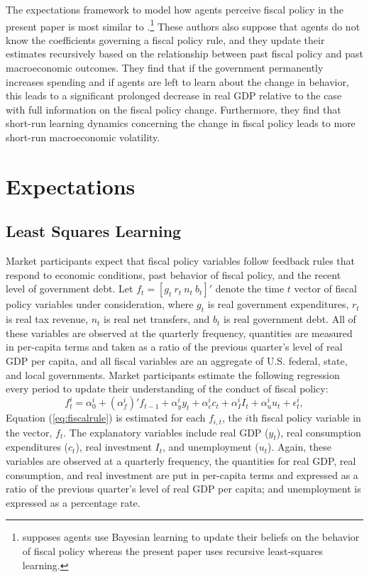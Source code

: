 \documentclass[11pt]{article}
\newcommand{\beq}{\begin{equation}}
\newcommand{\eeq}{\end{equation}}
\newcommand{\citee}[1]{\citet{#1}}
\begin{document}
The expectations framework to model how agents perceive fiscal policy in the present paper is most similar to \citee{hollmatt}.\footnote{\citee{hollmatt} supposes agents use Bayesian learning to update their beliefs on the behavior of fiscal policy whereas the present paper uses recursive least-squares learning.}  These authors also suppose that agents do not know the coefficients governing a fiscal policy rule, and they update their estimates recursively based on the relationship between past fiscal policy and past macroeconomic outcomes.  They find that if the government permanently increases spending and if agents are left to learn about the change in behavior, this leads to a significant prolonged decrease in real GDP relative to the case with full information on the fiscal policy change.  Furthermore, they find that short-run learning dynamics concerning the change in fiscal policy leads to more short-run macroeconomic volatility.

\section{Expectations}

\subsection{Least Squares Learning}
Market participants expect that fiscal policy variables follow feedback rules that respond to economic conditions, past behavior of fiscal policy, and the recent level of government debt.  Let $f_t = [g_t~ r_t~ n_t~ b_t]'$ denote the time $t$ vector of fiscal policy variables under consideration, where $g_t$ is real government expenditures, $r_t$ is real tax revenue, $n_t$ is real net transfers, and $b_t$ is real government debt.  All of these variables are observed at the quarterly frequency, quantities are measured in per-capita terms and taken as a ratio of the previous quarter's level of real GDP per capita, and all fiscal variables are an aggregate of U.S. federal, state, and local governments.  Market participants estimate the following regression every period to update their understanding of the conduct of fiscal policy:
\beq \label{eq:fiscalrule} f^{i}_{t} = \alpha^i_{0} + (\alpha^{i}_{f})' f_{t-1} + \alpha^i_{y} y_t + \alpha^i_c c_t + \alpha^i_I I_t + \alpha^i_u u_t + \epsilon^i_{t}, \eeq
Equation (\ref{eq:fiscalrule}) is estimated for each $f_{i,t}$, the $i$th fiscal policy variable in the vector, $f_t$.  The explanatory variables include real GDP ($y_t$), real consumption expenditures ($c_t$), real investment $I_t$, and unemployment ($u_t$).  Again, these variables are observed at a quarterly frequency, the quantities for real GDP, real consumption, and real investment are put in per-capita terms and expressed as a ratio of the previous quarter's level of real GDP per capita; and unemployment is expressed as a percentage rate.  
\end{document}
